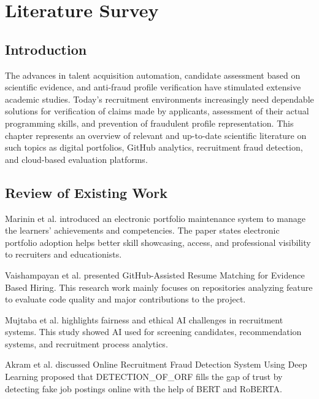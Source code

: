 
\chapter{Literature Survey}

\section{Introduction}
The advances in talent acquisition automation, candidate assessment based on scientific evidence, and anti-fraud profile verification have stimulated extensive academic studies. Today's recruitment environments increasingly need dependable solutions for verification of claims made by applicants, assessment of their actual programming skills, and prevention of fraudulent profile representation. This chapter represents an overview of relevant and up-to-date scientific literature on such topics as digital portfolios, GitHub analytics, recruitment fraud detection, and cloud-based evaluation platforms.

\section{Review of Existing Work}
Marinin et al. \cite{Marinin2025} introduced an electronic portfolio maintenance system to manage the learners' achievements and competencies. The paper states electronic portfolio adoption helps better skill showcasing, access, and professional visibility to recruiters and educationists.

Vaishampayan et al. \cite{Brown2026} presented GitHub-Assisted Resume Matching for Evidence Based Hiring. This research work mainly focuses on repositories analyzing feature to evaluate code quality and major contributions to the project.

Mujtaba et al. \cite{Mujtaba2024} highlights fairness and ethical AI challenges in recruitment systems. This study showed AI used for screening candidates, recommendation systems, and recruitment process analytics.

Akram et al. \cite{Akram2024} discussed Online Recruitment Fraud Detection System Using Deep Learning proposed that DETECTION\_OF\_ORF fills the gap of trust by detecting fake job postings online with the help of BERT and RoBERTA.

